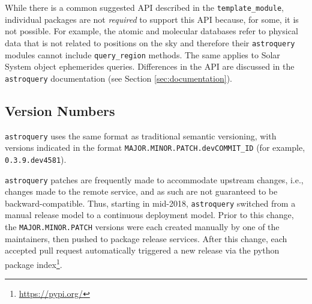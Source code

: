 \documentclass[twocolumn]{aastex62}
\newcommand{\package}[1]{\texttt{#1}\xspace}
\newcommand{\astroquery}{\package{astroquery}}
\newcommand{\astropypkg}{\package{astropy}}
\begin{document}
While there is a common suggested API described in the \texttt{template\_module},
individual packages are not \emph{required} to support this API because, for
some, it is not possible.  For example, the atomic and molecular databases refer
to physical data that is not related to positions on the sky and therefore
their \astroquery modules cannot include \texttt{query\_region} methods. The
same applies to Solar System object ephemerides queries. Differences in the API
are discussed in the \astroquery documentation (see Section
\ref{sec:documentation}).

\subsection{Version Numbers}
\label{sec:versionnumbers}
\astroquery uses the same format as traditional semantic versioning,
with versions indicated in the format \texttt{MAJOR.MINOR.PATCH.devCOMMIT\_ID} (for
example, \texttt{0.3.9.dev4581}).

\astroquery patches are frequently made to accommodate upstream changes, i.e.,
changes made to the remote service, and as such are not guaranteed to be
backward-compatible. Thus, starting in mid-2018, \astroquery switched from a manual release model to a
continuous deployment model.  Prior to this change, the
\texttt{MAJOR.MINOR.PATCH} versions were each created manually by one of the
maintainers, then pushed to package release services.  After this change, each
accepted pull request automatically triggered a new release via the python
package index\footnote{\url{https://pypi.org/}}.


%
\end{document}
